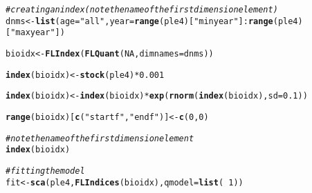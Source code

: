 \documentclass[a4paper,english,10pt]{article}\usepackage[]{graphicx}\usepackage[]{color}
\makeatletter
\newcommand{\hlnum}[1]{\textcolor[rgb]{0.686,0.059,0.569}{#1}}%
\newcommand{\hlstr}[1]{\textcolor[rgb]{0.192,0.494,0.8}{#1}}%
\newcommand{\hlcom}[1]{\textcolor[rgb]{0.678,0.584,0.686}{\textit{#1}}}%
\newcommand{\hlopt}[1]{\textcolor[rgb]{0,0,0}{#1}}%
\newcommand{\hlstd}[1]{\textcolor[rgb]{0.345,0.345,0.345}{#1}}%
\newcommand{\hlkwb}[1]{\textcolor[rgb]{0.69,0.353,0.396}{#1}}%
\newcommand{\hlkwc}[1]{\textcolor[rgb]{0.333,0.667,0.333}{#1}}%
\newcommand{\hlkwd}[1]{\textcolor[rgb]{0.737,0.353,0.396}{\textbf{#1}}}%
\newenvironment{kframe}{%
 \def\at@end@of@kframe{}%
 \ifinner\ifhmode%
  \def\at@end@of@kframe{\end{minipage}}%
  \begin{minipage}{\columnwidth}%
 \fi\fi%
 \def\FrameCommand##1{\hskip\@totalleftmargin \hskip-\fboxsep
 \colorbox{shadecolor}{##1}\hskip-\fboxsep
     \hskip-\linewidth \hskip-\@totalleftmargin \hskip\columnwidth}%
 \MakeFramed {\advance\hsize-\width
   \@totalleftmargin\z@ \linewidth\hsize
   \@setminipage}}%
 {\par\unskip\endMakeFramed%
 \at@end@of@kframe}
\newenvironment{knitrout}{}{} %
\makeatother
\begin{document}
\begin{knitrout}
\color{fgcolor}\begin{kframe}
\begin{alltt}
\hlcom{# creating an index (note the name of the first dimension element)}
\hlstd{dnms} \hlkwb{<-} \hlkwd{list}\hlstd{(}\hlkwc{age}\hlstd{=}\hlstr{"all"}\hlstd{,} \hlkwc{year}\hlstd{=}\hlkwd{range}\hlstd{(ple4)[}\hlstr{"minyear"}\hlstd{]}\hlopt{:}\hlkwd{range}\hlstd{(ple4)[}\hlstr{"maxyear"}\hlstd{])}
\end{alltt}


{\ttfamily\noindent\bfseries\color{errorcolor}{\#\# Error: object 'ple4' not found}}\begin{alltt}
\hlstd{bioidx} \hlkwb{<-} \hlkwd{FLIndex}\hlstd{(}\hlkwd{FLQuant}\hlstd{(}\hlnum{NA}\hlstd{,} \hlkwc{dimnames}\hlstd{=dnms))}
\end{alltt}


{\ttfamily\noindent\bfseries{}}\begin{alltt}
\hlkwd{index}\hlstd{(bioidx)} \hlkwb{<-} \hlkwd{stock}\hlstd{(ple4)}\hlopt{*}\hlnum{0.001}
\end{alltt}


{\ttfamily\noindent\bfseries{}}\begin{alltt}
\hlkwd{index}\hlstd{(bioidx)} \hlkwb{<-} \hlkwd{index}\hlstd{(bioidx)}\hlopt{*}\hlkwd{exp}\hlstd{(}\hlkwd{rnorm}\hlstd{(}\hlkwd{index}\hlstd{(bioidx),} \hlkwc{sd}\hlstd{=}\hlnum{0.1}\hlstd{))}
\end{alltt}


{\ttfamily\noindent\bfseries{}}\begin{alltt}
\hlkwd{range}\hlstd{(bioidx)[}\hlkwd{c}\hlstd{(}\hlstr{"startf"}\hlstd{,}\hlstr{"endf"}\hlstd{)]} \hlkwb{<-} \hlkwd{c}\hlstd{(}\hlnum{0}\hlstd{,}\hlnum{0}\hlstd{)}
\end{alltt}


{\ttfamily\noindent\bfseries\color{errorcolor}{\#\# Error: object 'bioidx' not found}}\begin{alltt}
\hlcom{# note the name of the first dimension element}
\hlkwd{index}\hlstd{(bioidx)}
\end{alltt}


{\ttfamily\noindent\bfseries{}}\begin{alltt}
\hlcom{# fitting the model}
\hlstd{fit} \hlkwb{<-} \hlkwd{sca}\hlstd{(ple4,} \hlkwd{FLIndices}\hlstd{(bioidx),} \hlkwc{qmodel}\hlstd{=}\hlkwd{list}\hlstd{(}\hlopt{~}\hlnum{1}\hlstd{))}
\end{alltt}


{\ttfamily\noindent\bfseries{}}\end{kframe}
\end{knitrout}
\end{document}
